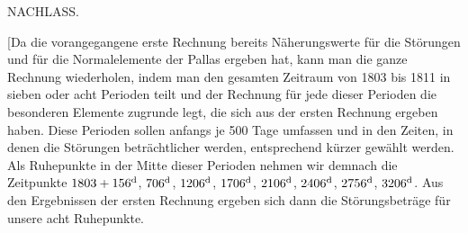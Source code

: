 \clearpage
{}
\begin{center}
{\Large NACHLASS.\par}
\par
\medskip
[DEZEMBER 1810.]\par
\bigskip
[1.]
\end{center}
\begingroup
\newcommand{\IVoneSum}[2][3.1pt]{\raisebox{-#1}[0pt][0pt]{\(#2\)}}
\newcommand{\IVoneMarkedComma}{\mathord{\text{\rlap{\kern.15em\raisebox{1.15ex}{\rule{.18em}{.25pt}}},\kern.25em}}}
\newcommand{\IVoneAboveMinus}{\text{\rlap{\kern.02em\raisebox{.95ex}{\tikz[baseline=0pt,x=1em,y=1ex]{\draw[line width=.15pt](0,.15) .. controls (.07,-.08) and (.16,-.10) .. (.24,0);}}}}}
\newcommand{\IVoneTrailingStroke}{\text{\kern.02em\raisebox{.5ex}{\rule{.22em}{.25pt}}}}
\noindent\hspace*{\parindent}[Da die vorangegangene erste Rechnung bereits Näherungswerte für die Störungen und für die Normalelemente der Pallas ergeben hat, kann man die ganze Rechnung wiederholen, indem man den gesamten Zeitraum von 1803 bis 1811 in sieben oder acht Perioden teilt und der Rechnung für jede dieser Perioden die besonderen Elemente zugrunde legt, die sich aus der ersten Rechnung ergeben haben. Diese Perioden sollen anfangs je 500 Tage umfassen und in den Zeiten, in denen die Störungen beträchtlicher werden, entsprechend kürzer gewählt werden. Als Ruhepunkte in der Mitte dieser Perioden nehmen wir demnach die Zeitpunkte \(1803+156^{\rm d}\), \(706^{\rm d}\), \(1206^{\rm d}\), \(1706^{\rm d}\), \(2106^{\rm d}\), \(2406^{\rm d}\), \(2756^{\rm d}\), \(3206^{\rm d}\). Aus den Ergebnissen der ersten Rechnung ergeben sich dann die Störungsbeträge für unsere acht Ruhepunkte.
